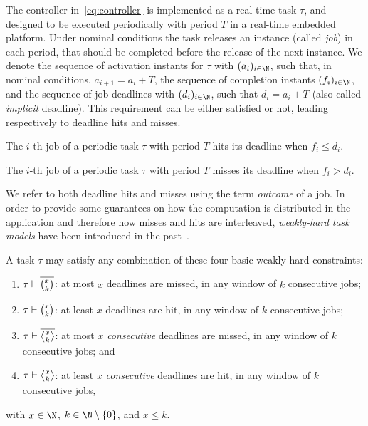 The controller in~\eqref{eq:controller} is implemented as a real-time task $\tau$, and designed to be executed periodically with period $T$ in a real-time embedded platform.
Under nominal conditions the task releases an instance (called \emph{job}) in each period, that should be completed before the release of the next instance.
We denote the sequence of activation instants for $\tau$ with $(a_i)_{i \in \N}$, such that, in nominal conditions, $a_{i+1} = a_i+T$,  the sequence of completion instants $(f_i)_{i \in \N}$, and the sequence of job deadlines with $(d_i)_{i \in \N}$, such that $d_i = a_i + T$ (also called \emph{implicit} deadline).
This requirement can be either satisfied or not, leading respectively to deadline hits and misses.
%
\begin{definition}%
\label{def:hit}%
    The $i$-th job of a periodic task $\tau$ with period $T$ hits its deadline when $f_i \leq d_i$.
\end{definition}

\begin{definition}%
\label{def:miss}%
    The $i$-th job of a periodic task $\tau$ with period $T$ misses its deadline when $f_i > d_i$.
\end{definition}
%
We refer to both deadline hits and misses using the term \emph{outcome} of a job.
In order to provide some guarantees on how the computation is distributed in the application and therefore how misses and hits are interleaved, \emph{weakly-hard task models} have been introduced in the past~\cite{Bernat:2001}.

\begin{definition}%
\label{def:weakly-hard}%
    A task $\tau$ may satisfy any combination of these four basic weakly
    hard constraints:
    \begin{enumerate}[label=(\roman*)]
        \item \label{item:mk} $\tau \vdash \overline{\binom{x_{}}{k_{}}}$: at most $x$ deadlines are missed, in any window of $k$ consecutive jobs;
        \item \label{item:hk} $\tau \vdash \binom{x_{}}{k_{}}$: at least $x$ deadlines are hit, in any window of $k$ consecutive jobs;
        \item \label{item:cons} $\tau \vdash \rowmiss{}$: at most $x$ \emph{consecutive} deadlines are missed, in any window of $k$ consecutive jobs; and
        \item $\tau \vdash \rowhit{}$: at least $x$ \emph{consecutive} deadlines are hit, in any window of $k$ consecutive jobs,
    \end{enumerate}
    with $x\in \N$, $k \in \N\setminus \left\{ 0 \right\}$, and $x\leq k$.
\end{definition}

